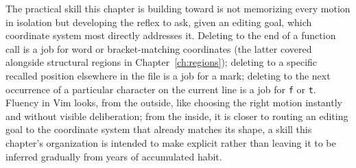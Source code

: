 The practical skill this chapter is building toward is not memorizing every motion in isolation but developing the reflex to ask, given an editing goal, which coordinate system most directly addresses it. Deleting to the end of a function call is a job for word or bracket-matching coordinates (the latter covered alongside structural regions in Chapter~\ref{ch:regions}); deleting to a specific recalled position elsewhere in the file is a job for a mark; deleting to the next occurrence of a particular character on the current line is a job for \texttt{f} or \texttt{t}. Fluency in Vim looks, from the outside, like choosing the right motion instantly and without visible deliberation; from the inside, it is closer to routing an editing goal to the coordinate system that already matches its shape, a skill this chapter's organization is intended to make explicit rather than leaving it to be inferred gradually from years of accumulated habit.
